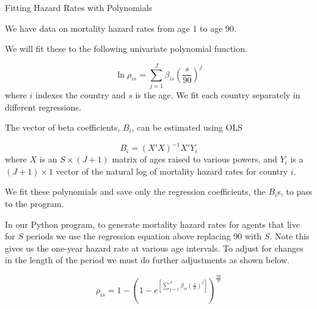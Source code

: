 \documentclass[letterpaper,12pt]{article}
\theoremstyle{definition}
\begin{document}
\begin{spacing}{1.5}


\LARGE{Fitting Hazard Rates with Polynomials} \normalsize

We have data on mortality hazard rates from age 1 to age $90$.

We will fit these to the following univariate polynomial function.

\begin{equation}
	\ln \rho_{is} = \sum_{j=1}^J \beta_{is} \left(\frac{s}{90}\right)^j
\end{equation}
where $i$ indexes the country and $s$ is the age.  We fit each country separately in different regressions.

The vector of beta coefficients, $B_i$, can be estimated using OLS

\begin{equation}
	B_i = (X'X)^{-1}X'Y_i
\end{equation}
where $X$ is an $S\times(J+1)$ matrix of ages raised to various powers, and $Y_i$ is a $(J+1)\times 1$ vector of the natural log of mortality hazard rates for country $i$.

We fit these polynomials and save only the regression coefficients, the $B_i$s, to pass to the program.

In our Python program, to generate mortality hazard rates for agents that live for $S$ periods we use the regression equation above replacing 90 with $S$.  Note this gives us the one-year hazard rate at various age intervals.  To adjust for changes in the length of the period we must do further adjustments as shown below.

\begin{equation}
	\rho_{is} = 1 - \left(1-e^{\left[\sum_{j=1}^J \beta_{is} \left(\frac{s}{S}\right)^j\right]}\right)^{\frac{70}{S}}
\end{equation}


\end{spacing}

\newpage

\end{document}
